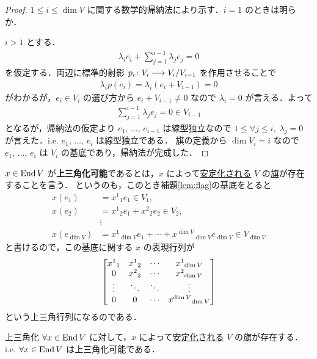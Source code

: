\documentclass[rep_main]{subfiles}
\begin{document}
\begin{proof}
    $1 \le i \le \dim V$ に関する数学的帰納法により示す．$i = 1$ のときは明らか．

    $i > 1$ とする．
    \begin{align}
        \lambda_{i} e_i + \sum_{j=1}^{i-1} \lambda_j e_j = 0
    \end{align}
    を仮定する．両辺に標準的射影 $p_i \colon V_i \longrightarrow V_i / V_{i-1}$ を作用させることで
    \begin{align}
        \lambda_i  p(e_i) = \lambda_i (e_i + V_{i-1}) = 0
    \end{align}
    がわかるが，$e_i \in V_i$ の選び方から $e_i + V_{i-1} \neq 0$ なので $\lambda_i = 0$ が言える．よって
    \begin{align}
        \sum_{j=1}^{i-1} \lambda_j e_j = 0 \in V_{i-1}
    \end{align}
    となるが，帰納法の仮定より $e_1,\, \dots,\, e_{i-1}$ は線型独立なので $1 \le \forall j \le i,\; \lambda_j = 0$ が言えた．i.e. $e_1,\, \dots,\, e_i$ は線型独立である．
    旗の定義から $\dim V_i = i$ なので $e_1,\, \dots,\, e_i$ は $V_i$ の基底であり，帰納法が完成した．
\end{proof}



$x \in \operatorname{End} V$ が\textbf{上三角化可能}であるとは，$x$ によって\hyperref[def:flag]{安定化される} $V$ の\hyperref[def:flag]{旗}が存在することを言う．
というのも，このとき補題\ref{lem:flag}の基底をとると
\begin{align}
    x(e_1) &= x^1{}_1 e_1 \in V_1, \\
    x(e_2) &= x^1{}_2 e_1 + x^2{}_2 e_2 \in V_2, \\
        &\vdots \\
    x(e_{\dim V}) &= x^1{}_{\dim V} e_1 + \cdots + x^{\dim V}{}_{\dim V} e_{\dim V} \in V_{\dim V}
\end{align}
と書けるので，この基底に関する $x$ の表現行列が
\begin{align}
    \mqty[x^1{}_1 & x^1{}_2 & \cdots &x^1{}_{\dim V} \\ 0 & x^2{}_2 & \cdots &x^2{}_{\dim V} \\ \vdots &\ddots &\ddots &\vdots \\ 0 & 0 &\cdots &x^{\dim V}{}_{\dim V}]
\end{align}
という上三角行列になるのである．

\begin{mytheo}[label=thm:upper-triangle]{上三角化}
    $\forall x \in \operatorname{End} V$ に対して，$x$ によって\hyperref[def:flag]{安定化される} $V$ の\hyperref[def:flag]{旗}が存在する．i.e. $\forall x \in \operatorname{End} V$ は上三角化可能である．
\end{mytheo}
\end{document}
